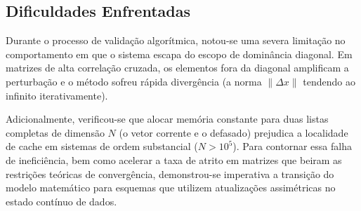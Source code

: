 \subsection{Dificuldades Enfrentadas}

Durante o processo de validação algorítmica, notou-se uma severa limitação no comportamento em que o sistema escapa do escopo de dominância diagonal. Em matrizes de alta correlação cruzada, os elementos fora da diagonal amplificam a perturbação e o método sofreu rápida divergência (a norma $\|\Delta x\|$ tendendo ao infinito iterativamente). 

Adicionalmente, verificou-se que alocar memória constante para duas listas completas de dimensão $N$ (o vetor corrente e o defasado) prejudica a localidade de cache em sistemas de ordem substancial ($N > 10^5$). Para contornar essa falha de ineficiência, bem como acelerar a taxa de atrito em matrizes que beiram as restrições teóricas de convergência, demonstrou-se imperativa a transição do modelo matemático para esquemas que utilizem atualizações assimétricas no estado contínuo de dados.